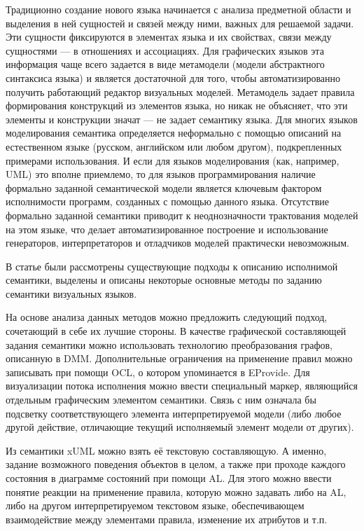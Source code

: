 \documentclass[a5paper]{article}
\begin{document}
Традиционно создание нового языка начинается с анализа предметной области и выделения в ней сущностей и связей между ними, важных для решаемой задачи. Эти сущности фиксируются в элементах языка и их свойствах, связи между сущностями — в отношениях и ассоциациях. Для графических языков эта информация чаще всего задается в виде метамодели (модели абстрактного синтаксиса языка) и является достаточной для того, чтобы автоматизированно получить работающий редактор визуальных моделей. Метамодель задает правила формирования конструкций из элементов языка, но никак не объясняет, что эти элементы и конструкции значат — не задает семантику языка. Для многих языков моделирования семантика определяется неформально с помощью описаний на естественном языке (русском, английском или любом другом), подкрепленных примерами использования. И если для языков моделирования (как, например, UML) это вполне приемлемо, то для языков программирования наличие формально заданной семантической модели является ключевым фактором 
исполнимости программ, созданных с помощью данного языка. Отсутствие формально заданной семантики приводит к неоднозначности трактования моделей на этом языке, что делает автоматизированное построение и использование генераторов, интерпретаторов и отладчиков моделей практически невозможным. 

В статье были рассмотрены существующие подходы к описанию исполнимой семантики, выделены и описаны некоторые основные методы по заданию семантики визуальных языков. 

На основе анализа данных методов можно предложить следующий подход, сочетающий в себе их лучшие стороны. В качестве графической составляющей задания семантики можно использовать технологию преобразования графов, описанную в DMM. Дополнительные ограничения на применение правил можно записывать при помощи OCL, о котором упоминается в EProvide. Для визуализации потока исполнения можно ввести специальный маркер, являющийся отдельным графическим элементом семантики. Связь с ним означала бы подсветку соответствующего элемента интерпретируемой модели (либо любое другой действие, отличающие текущий исполняемый элемент модели от других).

Из семантики xUML можно взять её текстовую составляющую. А именно, задание возможного поведения объектов в целом, а также при проходе каждого состояния в диаграмме состояний при помощи AL. Для этого можно ввести понятие реакции на применение правила, которую можно задавать либо на AL, либо на другом интерпретируемом текстовом языке, обеспечивающем взаимодействие между элементами правила, изменение их атрибутов и т.п.
\end{document}
